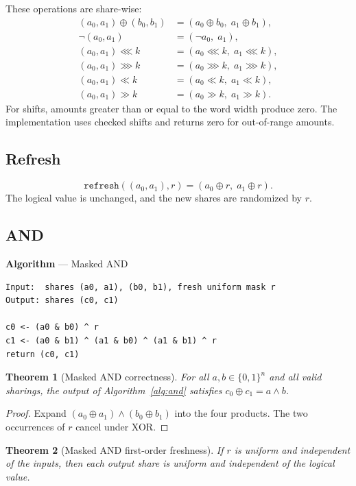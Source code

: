 \documentclass[11pt,a4paper]{article}
\newcommand{\bits}{\{0,1\}}
\newcommand{\code}[1]{\texttt{#1}}
\theoremstyle{plain}
\newtheorem{theorem}{Theorem}[section]
\theoremstyle{definition}
\theoremstyle{remark}
\newcounter{algblock}
\newenvironment{algorithmblock}[1]{%
  \par\medskip\refstepcounter{algblock}%
  \noindent\textbf{Algorithm \thealgblock} --- #1\par\nopagebreak
  \noindent\begin{minipage}{\linewidth}\small
}{%
  \end{minipage}\par\medskip
}
\begin{document}
These operations are share-wise:
\begin{align}
  (a_0,a_1)\oplus(b_0,b_1) &= (a_0\oplus b_0,\;a_1\oplus b_1),\\
  \neg(a_0,a_1) &= (\neg a_0,\;a_1),\\
  (a_0,a_1)\lll k &= (a_0\lll k,\;a_1\lll k),\\
  (a_0,a_1)\ggg k &= (a_0\ggg k,\;a_1\ggg k),\\
  (a_0,a_1)\ll k &= (a_0\ll k,\;a_1\ll k),\\
  (a_0,a_1)\gg k &= (a_0\gg k,\;a_1\gg k).
\end{align}
For shifts, amounts greater than or equal to the word width produce zero. The
implementation uses checked shifts and returns zero for out-of-range amounts.

\subsection{Refresh}

\[
  \code{refresh}((a_0,a_1),r) = (a_0\oplus r,\;a_1\oplus r).
\]
The logical value is unchanged, and the new shares are randomized by \(r\).

\subsection{AND}

\begin{algorithmblock}{Masked AND}\label{alg:and}
\begin{verbatim}
Input:  shares (a0, a1), (b0, b1), fresh uniform mask r
Output: shares (c0, c1)

c0 <- (a0 & b0) ^ r
c1 <- (a0 & b1) ^ (a1 & b0) ^ (a1 & b1) ^ r
return (c0, c1)
\end{verbatim}
\end{algorithmblock}

\begin{theorem}[Masked AND correctness]\label{thm:and}
For all \(a,b\in\bits^n\) and all valid sharings, the output of
Algorithm~\ref{alg:and} satisfies \(c_0\oplus c_1=a\wedge b\).
\end{theorem}

\begin{proof}
Expand \((a_0\oplus a_1)\wedge(b_0\oplus b_1)\) into the four products. The two
occurrences of \(r\) cancel under XOR.
\end{proof}

\begin{theorem}[Masked AND first-order freshness]\label{thm:and-fresh}
If \(r\) is uniform and independent of the inputs, then each output share is uniform
and independent of the logical value.
\end{theorem}
\end{document}
